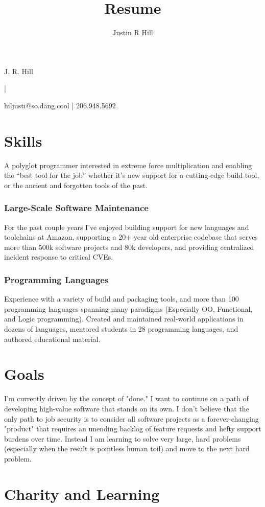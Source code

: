 \documentclass[9pt]{extarticle}
\author{Justin R Hill}
\title{Resume}
\makeatletter
\renewcommand{\maketitle}{
\begin{center}
\huge
J. R. Hill

|

\Large
hiljusti@so.dang.cool | 206.948.5692
\end{center}
}
\makeatother
\begin{document}
\maketitle


\section{Skills}

A polyglot programmer interested in extreme force multiplication and enabling
the ``best tool for the job'' whether it's new support for a cutting-edge build
tool, or the ancient and forgotten tools of the past.

\subsubsection{Large-Scale Software Maintenance}
For the past couple years I've enjoyed building support for new languages and
toolchains at Amazon, supporting a 20+ year old enterprise codebase that serves
more than 500k software projects and 80k developers, and providing centralized
incident response to critical CVEs.

\subsubsection{Programming Languages}
Experience with a variety of build and packaging tools, and more than 100
programming languages spanning many paradigms (Especially OO, Functional, and
Logic programming). Created and maintained real-world applications in dozens of
languages, mentored students in 28 programming languages, and authored
educational material.


\section{Goals}
I'm currently driven by the concept of "done." I want to continue on a path of
developing high-value software that stands on its own. I don't believe that the
only path to job security is to consider all software projects as a
forever-changing "product" that requires an unending backlog of feature requests
and hefty support burdens over time. Instead I am learning to solve very large,
hard problems (especially when the result is pointless human toil) and move to
the next hard problem.


\section{Charity and Learning}
\end{document}
